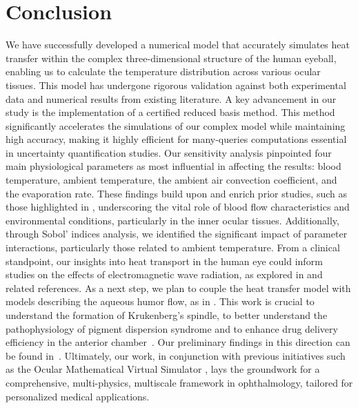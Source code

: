 \section{Conclusion}
\label{sec:conclusion}

We have successfully developed a numerical model that accurately simulates heat transfer within the complex three-dimensional structure of the human eyeball,
enabling us to calculate the temperature distribution across various ocular tissues.
This model has undergone rigorous validation against both experimental data and numerical results from existing literature.
A key advancement in our study is the implementation of a certified reduced basis method.
This method significantly accelerates the simulations of our complex model while maintaining high accuracy,
making it highly efficient for many-queries computations essential in uncertainty quantification studies.
Our sensitivity analysis pinpointed four main physiological parameters as most influential in affecting the results:
blood temperature, ambient temperature, the ambient air convection coefficient, and the evaporation rate.
These findings build upon and enrich prior studies, such as those highlighted in \cite{Scott_1988,NG2006268,li2010},
underscoring the vital role of blood flow characteristics and environmental conditions, particularly in the inner ocular tissues.
Additionally, through Sobol' indices analysis, we identified the significant impact of parameter interactions, particularly those related to ambient temperature.
From a clinical standpoint, our insights into heat transport in the human eye could inform studies on the effects of electromagnetic wave radiation,
as explored in \cite{Hirata2007,NG2007829,doi:10.1142/S0219519409002936} and related references.
As a next step, we plan to couple the heat transfer model with models describing the aqueous humor flow, as in \cite{OOI2008252,10.1007/978-3-030-63591-6_45}.
This work is crucial to understand the formation of Krukenberg's spindle, to better understand the pathophysiology of pigment dispersion syndrome and to enhance drug delivery efficiency in the anterior chamber~\cite{Wang2016,BHANDARI2020286}. Our preliminary findings in this direction can be found in~\cite{saigre:hal-04558924}.
Ultimately, our work, in conjunction with previous initiatives such as the Ocular Mathematical Virtual Simulator \cite{https://doi.org/10.1002/cnm.3791},
lays the groundwork for a comprehensive, multi-physics, multiscale framework in ophthalmology, tailored for personalized medical applications.
